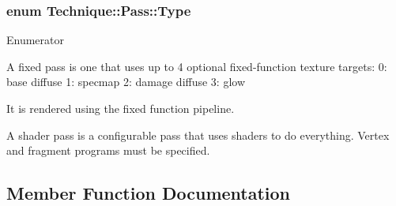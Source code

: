 \subsubsection[{\texorpdfstring{Type}{Type}}]{\setlength{\rightskip}{0pt plus 5cm}enum {\bf Technique\+::\+Pass\+::\+Type}}\hypertarget{classTechnique_1_1Pass_a6dccd6c3a50d047d7d3556f475be8bfa}{}\label{classTechnique_1_1Pass_a6dccd6c3a50d047d7d3556f475be8bfa}
\begin{Desc}
\item[Enumerator]\par
\begin{description}
\item[{\em 
Fixed\+Pass\hypertarget{classTechnique_1_1Pass_a6dccd6c3a50d047d7d3556f475be8bfaa68338075988079ed9e418084b6ff5916}{}\label{classTechnique_1_1Pass_a6dccd6c3a50d047d7d3556f475be8bfaa68338075988079ed9e418084b6ff5916}
}]A fixed pass is one that uses up to 4 optional fixed-\/function texture targets\+: 0\+: base diffuse 1\+: specmap 2\+: damage diffuse 3\+: glow

It is rendered using the fixed function pipeline. \item[{\em 
Shader\+Pass\hypertarget{classTechnique_1_1Pass_a6dccd6c3a50d047d7d3556f475be8bfaa778a78c4df6424faf4312990fb8900f5}{}\label{classTechnique_1_1Pass_a6dccd6c3a50d047d7d3556f475be8bfaa778a78c4df6424faf4312990fb8900f5}
}]A shader pass is a configurable pass that uses shaders to do everything. Vertex and fragment programs must be specified. \end{description}
\end{Desc}


\subsection{Member Function Documentation}
